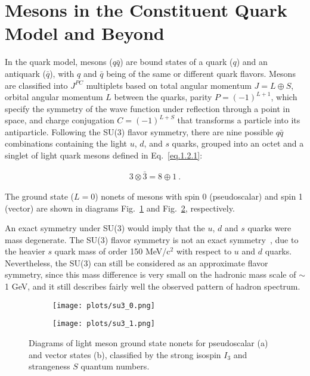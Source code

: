 \section{Mesons in the Constituent Quark Model and Beyond}
\label{p.1.2}

In the quark model, mesons ($q\bar{q}$) are bound states of a quark ($q$) and an antiquark ($\bar{q}$), with $q$ and $\bar{q}$ being of the same or different quark flavors. Mesons are classified into $J^{PC}$ multiplets based on  total angular momentum $J = L \oplus S$, orbital angular momentum $L$ between the quarks, parity $P=(-1)^{L+1}$, which specify the symmetry of the wave function under reflection through a point in space, and charge conjugation $C=(-1)^{L+S}$ that transforms a particle into its antiparticle. Following the SU(3) flavor symmetry, there are nine possible $q\bar{q}$ combinations containing the light $u$, $d$, and $s$ quarks, grouped into an octet and a singlet of light quark mesons defined in Eq.~\ref{eq.1.2.1}:

\begin{equation}
    \label{eq.1.2.1}
    \begin{aligned}
        3 \otimes \bar{3} = 8 \oplus 1~.
    \end{aligned}
\end{equation}

The ground state ($L=0$) nonets of mesons with spin 0 (pseudoscalar) and spin 1 (vector) are shown in diagrams Fig.~\ref{fig.1.2.1.a} and Fig.~\ref{fig.1.2.1.b}, respectively.
~\par An exact symmetry under SU(3) would imply that the $u$, $d$ and $s$ quarks were mass degenerate. The SU(3) flavor symmetry is not an exact symmetry~\cite{Zweig64}, due to the heavier $s$ quark mass of order 150 MeV/c$^{2}$ with respect to $u$ and $d$ quarks. Nevertheless, the SU(3) can still be considered as an approximate flavor symmetry, since this mass difference is very small on the hadronic mass scale of $\sim$ 1 GeV, and it still describes fairly well the observed pattern of hadron spectrum.

\begin{figure}[H]
    \centering
    \begin{subfigure}[H]{0.5\textwidth}
        \texttt{[image: plots/su3\_0.png]}
        \caption{}
        \label{fig.1.2.1.a}
    \end{subfigure}\hfill
    \begin{subfigure}[H]{0.5\textwidth}
        \texttt{[image: plots/su3\_1.png]}
        \caption{}
        \label{fig.1.2.1.b}
    \end{subfigure}
    \caption{Diagrams of light meson ground state nonets for pseudoscalar (a) and vector states (b), classified by the strong isospin $I_3$ and strangeness $S$ quantum numbers.}
    \label{fig.1.2.1}
\end{figure}

